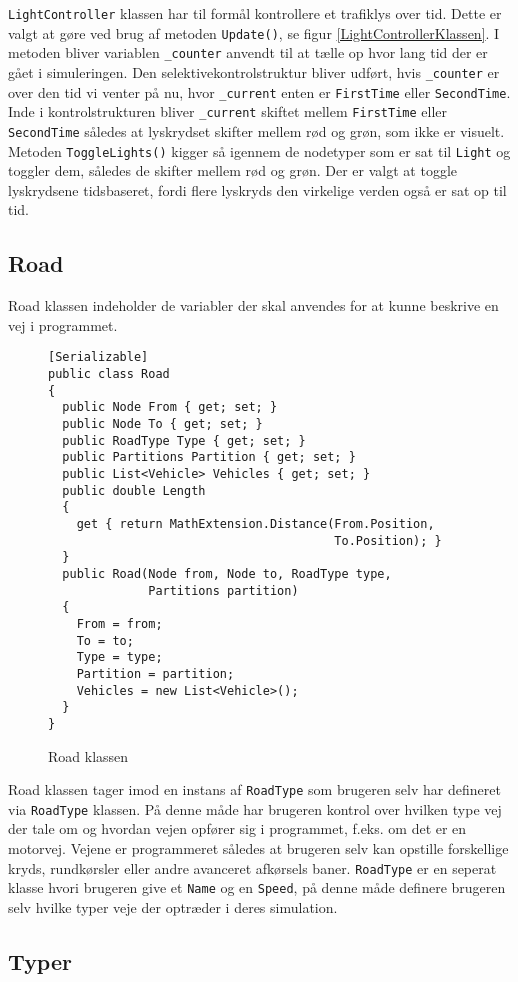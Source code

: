 \texttt{LightController} klassen har til formål kontrollere et trafiklys over tid. Dette er valgt at gøre ved brug af metoden \texttt{Update()}, se figur \ref{LightControllerKlassen}. I metoden bliver variablen \texttt{_counter} anvendt til at tælle op hvor lang tid der er gået i simuleringen. Den selektivekontrolstruktur bliver udført, hvis \texttt{_counter} er over den tid vi venter på nu, hvor \texttt{_current} enten er \texttt{FirstTime} eller \texttt{SecondTime}. Inde i kontrolstrukturen bliver \texttt{_current} skiftet mellem \texttt{FirstTime} eller \texttt{SecondTime} således at lyskrydset skifter mellem rød og grøn, som ikke er visuelt. Metoden \texttt{ToggleLights()} kigger så igennem de nodetyper som er sat til \texttt{Light} og toggler dem, således de skifter mellem rød og grøn. Der er valgt at toggle lyskrydsene tidsbaseret, fordi flere lyskryds den virkelige verden også er sat op til tid.

\subsection{Road}
Road klassen indeholder de variabler der skal anvendes for at kunne beskrive en vej i programmet.

\begin{figure}[H]
\begin{lstlisting}
[Serializable]
public class Road
{
  public Node From { get; set; }
  public Node To { get; set; }
  public RoadType Type { get; set; }
  public Partitions Partition { get; set; }
  public List<Vehicle> Vehicles { get; set; }
  public double Length
  {
    get { return MathExtension.Distance(From.Position, 
                                        To.Position); }
  }   
  public Road(Node from, Node to, RoadType type, 
              Partitions partition)
  {
    From = from;
    To = to;
    Type = type;
    Partition = partition;
    Vehicles = new List<Vehicle>();
  }
}
\end{lstlisting}
\caption{Road klassen}\label{RoadKlassen}
\end{figure}

Road klassen tager imod en instans af \texttt{RoadType} som brugeren selv har defineret via \texttt{RoadType} klassen. På denne måde har brugeren kontrol over hvilken type vej der tale om og hvordan vejen opfører sig i programmet, f.eks. om det er en motorvej. Vejene er programmeret således at brugeren selv kan opstille forskellige kryds, rundkørsler eller andre avanceret afkørsels baner. \texttt{RoadType} er en seperat klasse hvori brugeren give et \texttt{Name} og en \texttt{Speed}, på denne måde definere brugeren selv hvilke typer veje der optræder i deres simulation.

\subsection{Typer}